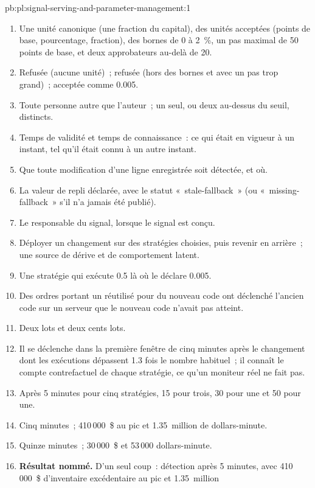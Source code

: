 \begin{solution}{pb:pl:signal-serving-and-parameter-management:1}
\begin{enumerate}
\item Une unité canonique (une fraction du capital), des unités acceptées (points de base, pourcentage, fraction), des bornes de 0 à 2~\%, un pas maximal de 50
points de base, et deux approbateurs au-delà de 20.
\item Refusée (aucune unité)~; refusée (hors des bornes et avec un pas trop grand)~; acceptée comme 0.005.
\item Toute personne autre que l'auteur~; un seul, ou deux au-dessus du seuil, distincts.
\item Temps de validité et temps de connaissance~: ce qui était en vigueur à un instant, tel qu'il était connu à un autre instant.
\item Que toute modification d'une ligne enregistrée soit détectée, et où.
\item La valeur de repli déclarée, avec le statut «~stale-fallback~» (ou «~missing-fallback~» s'il n'a jamais été publié).
\item Le responsable du signal, lorsque le signal est conçu.
\item Déployer un changement sur des stratégies choisies, puis revenir en arrière~; une source de dérive et de comportement latent.
\item Une stratégie qui exécute 0.5 là où le  déclare 0.005.
\item Des ordres portant un  réutilisé pour du nouveau code ont déclenché l'ancien code sur un serveur que le nouveau code n'avait pas atteint.
\item Deux lots et deux cents lots.
\item Il se déclenche dans la première fenêtre de cinq minutes après le changement dont les exécutions dépassent 1.3 fois le nombre habituel~; il connaît le compte contrefactuel
de chaque stratégie, ce qu'un moniteur réel ne fait pas.
\item Après 5 minutes pour cinq stratégies, 15 pour trois, 30 pour une et 50 pour une.
\item Cinq minutes~; 410\,000~\$ au pic et 1.35~million de dollars-minute.
\item Quinze minutes~; 30\,000~\$ et 53\,000 dollars-minute.
\item \textbf{Résultat nommé.} D'un seul coup~: détection après 5 minutes, avec 410\,000~\$ d'inventaire excédentaire au pic et 1.35~million

\end{enumerate}
\end{solution}
